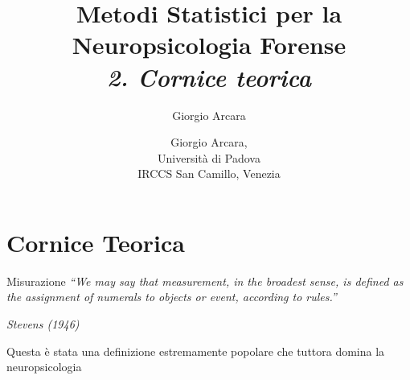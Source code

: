 \documentclass[
  ignorenonframetext,
]{beamer}
\author{Giorgio Arcara}
\date{}
\begin{document}
\begin{frame}
\title{Metodi Statistici per la Neuropsicologia Forense\\ \vspace{1em} \emph{2. Cornice teorica}}
\author{Giorgio Arcara,\\ Università di Padova \\ IRCCS San Camillo, Venezia}

\maketitle
\end{frame}

\section{Cornice Teorica}\label{cornice-teorica}

\begin{frame}{Misurazione}
\label{misurazione}
\emph{``We may say that measurement, in the broadest sense, is defined
as the assignment of numerals to objects or event, according to
rules.''}

\emph{Stevens (1946)} \pause \vspace{2em}

Questa è stata una definizione estremamente popolare che tuttora domina
la neuropsicologia
\end{frame}
\end{document}
